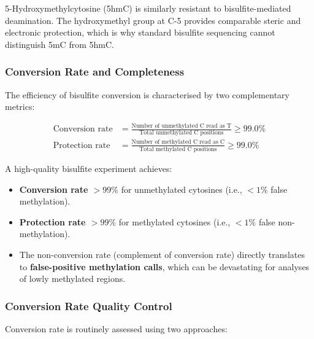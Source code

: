 5-Hydroxymethylcytosine (5hmC) is similarly resistant to bisulfite-mediated deamination. The hydroxymethyl group at C-5 provides comparable steric and electronic protection, which is why standard bisulfite sequencing cannot distinguish 5mC from 5hmC.

\subsubsection{Conversion Rate and Completeness}

The efficiency of bisulfite conversion is characterised by two complementary metrics:

\begin{align}
\label{eq:methylation:conversion-rate}
\text{Conversion rate} &= \frac{\text{Number of unmethylated C read as T}}{\text{Total unmethylated C positions}} \geq 99.0\% \\[6pt]
\label{eq:methylation:protection-rate}
\text{Protection rate} &= \frac{\text{Number of methylated C read as C}}{\text{Total methylated C positions}} \geq 99.0\%
\end{align}

A high-quality bisulfite experiment achieves:
\begin{itemize}[itemsep=2pt]
  \item \textbf{Conversion rate $> 99\%$} for unmethylated cytosines (i.e., $< 1\%$ false methylation).
  \item \textbf{Protection rate $> 99\%$} for methylated cytosines (i.e., $< 1\%$ false non-methylation).
  \item The non-conversion rate (complement of conversion rate) directly translates to \textbf{false-positive methylation calls}, which can be devastating for analyses of lowly methylated regions.
\end{itemize}

\subsubsection{Conversion Rate Quality Control}
\label{subsubsec:methylation:conversion-qc}

Conversion rate is routinely assessed using two approaches:

